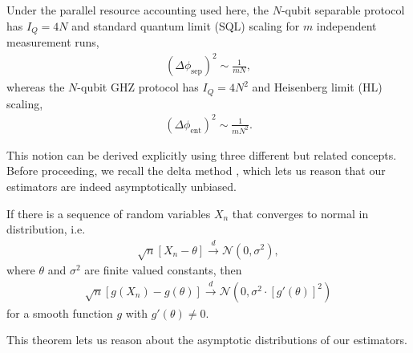 \begin{fact}\label{fact:sql-vs-hl}
Under the parallel resource accounting used here, the $N$-qubit separable protocol has $I_Q=4N$ and standard quantum limit (SQL) scaling for $m$ independent measurement runs,
\begin{align}
    (\Delta \phi_\text{sep})^2 \sim \frac 1 {m N},
\end{align}
whereas the $N$-qubit GHZ protocol has $I_Q=4N^2$ and Heisenberg limit (HL) scaling,
\begin{align}
    (\Delta \phi_\text{ent})^2 \sim \frac 1 {m N^2}.
\end{align}
\end{fact}

This notion can be derived explicitly using three different but related concepts.
Before proceeding, we recall the delta method \cite{doobLimitingDistributionsCertain1935},
which lets us reason that our estimators are indeed asymptotically unbiased.
\begin{theorem}\label{thm:delta-method}
If there is a sequence of random variables $X_n$ that converges to normal in distribution, i.e.
\begin{align}
\sqrt n [X_n - \theta] \xrightarrow{d} \mathcal N(0, \sigma^2),
\end{align}
where $\theta$ and $\sigma^2$ are finite valued constants, then
\begin{align}
\sqrt n [g(X_n) - g(\theta)]\xrightarrow{d} \mathcal N (0, \sigma^2 \cdot [g'(\theta)] ^2)
\end{align}
for a smooth function $g$ with $g'(\theta)\neq 0$.
\end{theorem}

This theorem lets us reason about the asymptotic distributions of our estimators.

